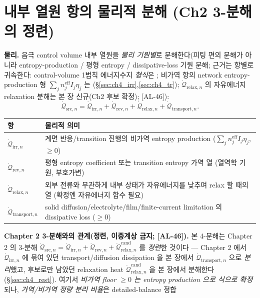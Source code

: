 \documentclass[11pt,a4paper]{article}
\newcommand{\eff}{\mathrm{eff}}
\newcommand{\irr}{\mathrm{irr}}
\newcommand{\rev}{\mathrm{rev}}
\newcommand{\src}{\mathrm{src}}
\newcommand{\rlx}{\mathrm{relax}}
\newcommand{\cand}{\mathrm{cand}}
\newcommand{\transp}{\mathrm{transport}}
\newcommand{\AL}[1]{\textsf{[AL-#1]}}
\begin{document}
\section{내부 열원 항의 물리적 분해 (Ch2 3-분해의 정련)}\label{sec:ch4_decomp}
\textbf{물리.} 음극 control volume 내부 열원을 \emph{물리 기원별}로 분해한다(피팅 편의 분해가 아니라
entropy-production / 평형 entropy / dissipative-loss 기원 분해; 근거는 항별로 귀속한다: control-volume 1법칙
에너지수지 \emph{형식}은 \cite{bernardi1985,rao1997}; 비가역 항의 network entropy-production 형
$\sum_j n_j^{\eff}I_j\eta_j$ 는 \cite{degrootmazur1962,schnakenberg1976}(\S\ref{sec:ch4_irr},\ref{sec:ch4_tr});
$\dot{\mathcal Q}_{\rlx,n}$ 의 자유에너지 relaxation 분해는 본 장 신규(Ch2 후보 확정); \AL{46}):
\begin{equation}
\dot{\mathcal Q}_{\src,n}=\dot{\mathcal Q}_{\irr,n}+\dot{\mathcal Q}_{\rev,n}+\dot{\mathcal Q}_{\rlx,n}+\dot{\mathcal Q}_{\transp,n}.
\label{eq:ch4_decomp}
\end{equation}
\begin{longtable}{p{} >{\raggedright\arraybackslash}p{}}
\toprule 항 & 물리적 의미 \\ \midrule \endhead
$\dot{\mathcal Q}_{\irr,n}$ & 계면 반응/transition 진행의 비가역 entropy production ($\sum_j n_j^{\eff}I_j\eta_j$, $\ge0$) \\
$\dot{\mathcal Q}_{\rev,n}$ & 평형 entropy coefficient 또는 transition entropy 가역 열 (열역학 기원, 부호가변) \\
$\dot{\mathcal Q}_{\rlx,n}$ & 외부 전류와 무관하게 내부 상태가 자유에너지를 낮추며 relax 할 때의 열 (확정엔 자유에너지 함수 필요) \\
$\dot{\mathcal Q}_{\transp,n}$ & solid diffusion/electrolyte/film/finite-current limitation 의 dissipative loss ($\ge0$) \\
\bottomrule
\end{longtable}
\textbf{Chapter 2 3-분해와의 관계(정련, 이중계상 금지; \AL{46}).} 본 4-분해는 Chapter 2 의 3-분해
$\dot{\mathcal Q}_{\src,n}=\dot{\mathcal Q}_{\irr,n}+\dot{\mathcal Q}_{\rev,n}+\dot{\mathcal Q}_{\rlx,n}^{\cand}$
를 \emph{정련}한 것이다 — Chapter 2 에서 $\dot{\mathcal Q}_{\irr,n}$ 에 묶여 있던 transport/diffusion
dissipation 을 본 장에서 $\dot{\mathcal Q}_{\transp,n}$ 으로 \emph{분리}했고, 후보로만 남았던 relaxation heat
$\dot{\mathcal Q}_{\rlx,n}^{\cand}$ 을 본 장에서 분해한다(\S\ref{sec:ch4_rest}). 여기서 \emph{비가역 floor
$\ge0$ 는 entropy production 으로 식으로 확정}되나, \emph{가역/비가역 정량 분리 비율}은 detailed-balance 정합
\end{document}
